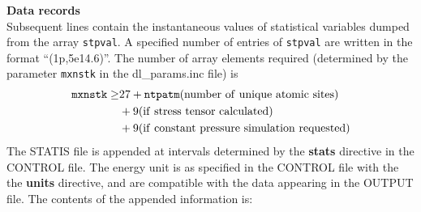 {\bf Data records}\\ Subsequent lines contain the instantaneous values
of statistical variables dumped from the array {\tt stpval}. A
specified number of
entries of {\tt stpval} are written in the format ``(1p,5e14.6)''. 
The number of array elements required (determined by the parameter
{\tt mxnstk} in
the {\sc dl\_params.inc} file) is
\begin{eqnarray}
{\tt mxnstk} \ge& 27  + {\tt ntpatm} (\rm
number~of~unique~atomic~sites) \nonumber\\
                & +  9 (\rm if~stress~tensor~calculated) \nonumber\\
                & +  9 (\rm if~constant~pressure~simulation~requested)
\nonumber
\end{eqnarray}
The STATIS file is appended at intervals determined by the
{\bf stats} directive in the CONTROL file. The energy
unit is as specified in the CONTROL file with the the {\bf units}
directive, and are compatible with the data appearing in the OUTPUT
file.  The contents of the appended information is:
